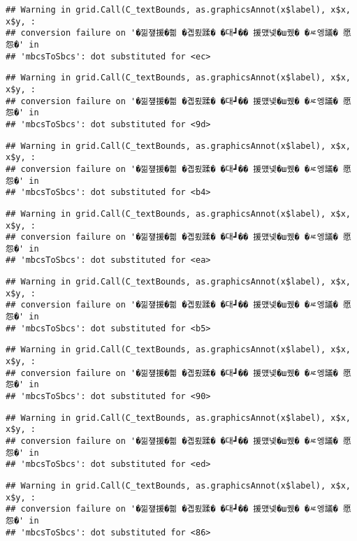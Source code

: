 \documentclass[
]{article}
\begin{document}
\begin{verbatim}
## Warning in grid.Call(C_textBounds, as.graphicsAnnot(x$label), x$x, x$y, :
## conversion failure on '�낆쟾援�쁾 �곕룄蹂� �대┛�� 援먰넻�ш퀬� �ㅼ엥議� 愿怨�' in
## 'mbcsToSbcs': dot substituted for <ec>
\end{verbatim}

\begin{verbatim}
## Warning in grid.Call(C_textBounds, as.graphicsAnnot(x$label), x$x, x$y, :
## conversion failure on '�낆쟾援�쁾 �곕룄蹂� �대┛�� 援먰넻�ш퀬� �ㅼ엥議� 愿怨�' in
## 'mbcsToSbcs': dot substituted for <9d>
\end{verbatim}

\begin{verbatim}
## Warning in grid.Call(C_textBounds, as.graphicsAnnot(x$label), x$x, x$y, :
## conversion failure on '�낆쟾援�쁾 �곕룄蹂� �대┛�� 援먰넻�ш퀬� �ㅼ엥議� 愿怨�' in
## 'mbcsToSbcs': dot substituted for <b4>
\end{verbatim}

\begin{verbatim}
## Warning in grid.Call(C_textBounds, as.graphicsAnnot(x$label), x$x, x$y, :
## conversion failure on '�낆쟾援�쁾 �곕룄蹂� �대┛�� 援먰넻�ш퀬� �ㅼ엥議� 愿怨�' in
## 'mbcsToSbcs': dot substituted for <ea>
\end{verbatim}

\begin{verbatim}
## Warning in grid.Call(C_textBounds, as.graphicsAnnot(x$label), x$x, x$y, :
## conversion failure on '�낆쟾援�쁾 �곕룄蹂� �대┛�� 援먰넻�ш퀬� �ㅼ엥議� 愿怨�' in
## 'mbcsToSbcs': dot substituted for <b5>
\end{verbatim}

\begin{verbatim}
## Warning in grid.Call(C_textBounds, as.graphicsAnnot(x$label), x$x, x$y, :
## conversion failure on '�낆쟾援�쁾 �곕룄蹂� �대┛�� 援먰넻�ш퀬� �ㅼ엥議� 愿怨�' in
## 'mbcsToSbcs': dot substituted for <90>
\end{verbatim}

\begin{verbatim}
## Warning in grid.Call(C_textBounds, as.graphicsAnnot(x$label), x$x, x$y, :
## conversion failure on '�낆쟾援�쁾 �곕룄蹂� �대┛�� 援먰넻�ш퀬� �ㅼ엥議� 愿怨�' in
## 'mbcsToSbcs': dot substituted for <ed>
\end{verbatim}

\begin{verbatim}
## Warning in grid.Call(C_textBounds, as.graphicsAnnot(x$label), x$x, x$y, :
## conversion failure on '�낆쟾援�쁾 �곕룄蹂� �대┛�� 援먰넻�ш퀬� �ㅼ엥議� 愿怨�' in
## 'mbcsToSbcs': dot substituted for <86>
\end{verbatim}
\end{document}

